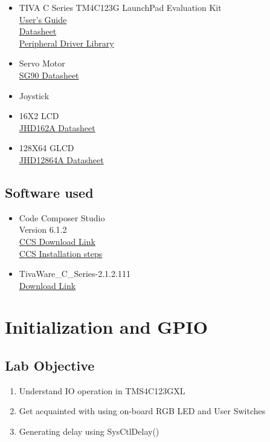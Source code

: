 \documentclass[a4paper,12pt,oneside]{book}
\begin{document}
\begin{itemize}
  \item TIVA C Series TM4C123G LaunchPad Evaluation Kit\\
  \href{http://www.ti.com/lit/ug/spmu296/spmu296.pdf}{User's Guide}\\
  \href{http://www.ti.com.cn/cn/lit/ds/symlink/tm4c123gh6pm.pdf}{Datasheet}\\
  \href{http://www.ti.com/lit/ug/spmu298a/spmu298a.pdf}{Peripheral Driver Library}
  \item Servo Motor\\
  \href{http://www.micropik.com/PDF/SG90Servo.pdf}{SG90 Datasheet}\\
  \item Joystick
  \item 16X2 LCD \\
  \href{http://www.agspecinfo.com/pdfs/J/JHD162A.PDF}{JHD162A Datasheet}\\
  \item 128X64 GLCD\\
  \href{http://www.agspecinfo.com/pdfs/J/JHD12864.PDF}{JHD12864A Datasheet}\\
\end{itemize}

\section{Software used}
\begin{itemize}
  \item Code Composer Studio\\  
  Version 6.1.2 \\
  \href{http://processors.wiki.ti.com/index.php/Download_CCS}{CCS Download Link}\\
  \href{http://processors.wiki.ti.com/index.php/GSG:CCSv6_installation}{CCS Installation steps}
  \item TivaWare\_C\_Series-2.1.2.111\\
  \href{http://www.ti.com/tool/sw-tm4c}{Download Link}
\end{itemize}

\newpage
\chapter{Initialization and GPIO}
\section{Lab Objective}
\begin{enumerate}
\item 
Understand IO operation in TMS4C123GXL
\item
Get acquainted with using on-board RGB LED and User Switches
\item
Generating delay using SysCtlDelay()
\end{enumerate}
\end{document}
